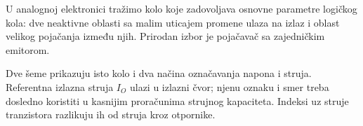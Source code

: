 U analognoj elektronici tražimo kolo koje zadovoljava osnovne parametre logičkog kola: dve neaktivne oblasti sa malim uticajem promene ulaza na izlaz i oblast velikog pojačanja između njih. Prirodan izbor je pojačavač sa zajedničkim emitorom.

Dve šeme prikazuju isto kolo i dva načina označavanja napona i struja. Referentna izlazna struja $I_O$ ulazi u izlazni čvor; njenu oznaku i smer treba dosledno koristiti u kasnijim proračunima strujnog kapaciteta. Indeksi uz struje tranzistora razlikuju ih od struja kroz otpornike.
